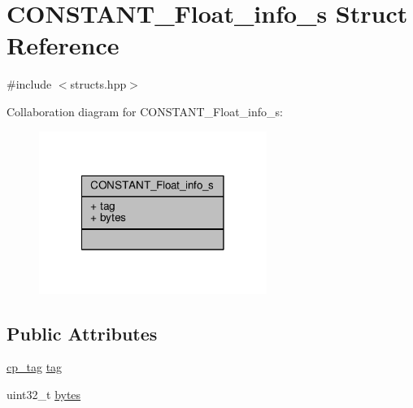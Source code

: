 \hypertarget{structCONSTANT__Float__info__s}{\section{C\+O\+N\+S\+T\+A\+N\+T\+\_\+\+Float\+\_\+info\+\_\+s Struct Reference}
\label{structCONSTANT__Float__info__s}
}


{\ttfamily \#include $<$structs.\+hpp$>$}



Collaboration diagram for C\+O\+N\+S\+T\+A\+N\+T\+\_\+\+Float\+\_\+info\+\_\+s\+:\nopagebreak
\begin{figure}[H]
\begin{center}
\leavevmode
\includegraphics[width=210pt]{structCONSTANT__Float__info__s__coll__graph}
\end{center}
\end{figure}
\subsection*{Public Attributes}
\begin{DoxyCompactItemize}
\item 
\hyperlink{structs_8hpp_a17947ec3f3c1f2392eabd36c1ba5fec6}{cp\+\_\+tag} \hyperlink{structCONSTANT__Float__info__s_a478b54b29def2238db495fd72bd2c983}{tag}
\item 
uint32\+\_\+t \hyperlink{structCONSTANT__Float__info__s_a8055082e9793f98ddd1feb21029262c6}{bytes}
\end{DoxyCompactItemize}


